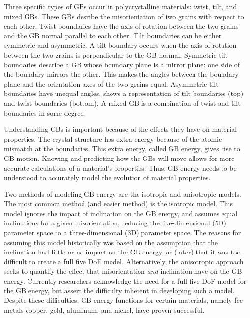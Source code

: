 \documentclass[twoside,senior]{BYUPhys}
\begin{document}
Three specific types of GBs occur in polycrystalline materials: twist, tilt, and mixed GBs.\cite{lejcek2010, rohrer2011}  These GBs desribe the misorientation of two grains with respect to each other.  Twist boundaries have the axis of rotation between the two grains and the GB normal parallel to each other. Tilt boundaries can be either symmetric and asymmetric.  A tilt boundary occurs when the axis of rotation between the two grains is perpendicular to the GB normal.  Symmetric tilt boundaries describe a GB whose boundary plane is a mirror plane: one side of the boundary mirrors the other.  This makes the angles between the boundary plane and the orientation axes of the two grains equal. Asymmetric tilt boundaries have unequal angles.   shows a representation of tilt boundaries (top) and twist boundaries (bottom).  A mixed GB is a combination of twist and tilt boundaries in some degree.

Understanding GBs is important because of the effects they have on material properties.\cite{patala2013, homer2015, bulatov2014}  The crystal structure has extra energy because of the atomic mismatch at the boundaries.  This extra energy, called GB energy, gives rise to GB motion.  Knowing and predicting how the GBs will move allows for more accurate calculations of a material's properties.  Thus, GB energy needs to be understood to accurately model the evolution of material properties.

Two methods of modeling GB energy are the isotropic and anisotropic models.  The most common method (and easier method) is the isotropic model.  This model ignores the impact of inclination on the GB energy, and assumes equal inclinations for a given misorientation, reducing the five-dimensional (5D) parameter space to a three-dimensional (3D) parameter space.  The reasons for assuming this model historically was based on the assumption that the inclination had little or no impact on the GB energy, or (later) that it was too difficult to create a full five DoF model.\cite{homer2015}  Alternatively, the anisotropic approach seeks to quantify the effect that misorientation \emph{and} inclination have on the GB energy.  Currently researchers acknowledge the need for a full five DoF model for the GB energy, but assert the difficulty inherent in developing such a model.\cite{rohrer2011, lejcek2010, homer2015}  Despite these difficulties, GB energy functions for certain materials, namely fcc metals copper, gold, aluminum, and nickel, have proven successful.\cite{bulatov2014}
\end{document}
